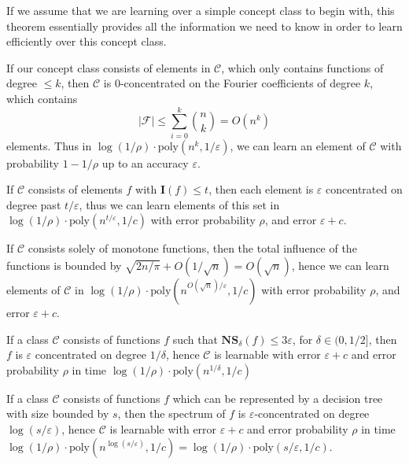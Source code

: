 If we assume that we are learning over a simple concept class to begin with, this theorem essentially provides all the information we need to know in order to learn efficiently over this concept class.

\begin{example}
    If our concept class consists of elements in $\mathcal{C}$, which only contains functions of degree $\leq k$, then $\mathcal{C}$ is 0-concentrated on the Fourier coefficients of degree $k$, which contains
    \[ |\mathcal{F}| \leq \sum_{i = 0}^k {n \choose k} = O(n^k) \]
    elements. Thus in $\log(1/\rho) \cdot \text{poly}(n^k,1/\varepsilon)$, we can learn an element of $\mathcal{C}$ with probability $1 - 1/\rho$ up to an accuracy $\varepsilon$.
\end{example}

\begin{example}
    If $\mathcal{C}$ consists of elements $f$ with $\mathbf{I}(f) \leq t$, then each element is $\varepsilon$ concentrated on degree past $t/\varepsilon$, thus we can learn elements of this set in $\log(1/\rho) \cdot \text{poly}(n^{t/\varepsilon}, 1/c)$ with error probability $\rho$, and error $\varepsilon + c$.
\end{example}

\begin{example}
    If $\mathcal{C}$ consists solely of monotone functions, then the total influence of the functions is bounded by $\sqrt{2n/\pi} + O(1/\sqrt{n}) = O(\sqrt{n})$, hence we can learn elements of $\mathcal{C}$ in $\log(1/\rho) \cdot \text{poly}(n^{O(\sqrt{n})/\varepsilon},1/c)$ with error probability $\rho$, and error $\varepsilon + c$.
\end{example}

\begin{example}
    If a class $\mathcal{C}$ consists of functions $f$ such that $\mathbf{NS}_\delta(f) \leq 3\varepsilon$, for $\delta \in (0,1/2]$, then $f$ is $\varepsilon$ concentrated on degree $1/\delta$, hence $\mathcal{C}$ is learnable with error $\varepsilon + c$ and error probability $\rho$ in time $\log(1/\rho) \cdot \text{poly}(n^{1/\delta},1/c)$
\end{example}

\begin{example}
    If a class $\mathcal{C}$ consists of functions $f$ which can be represented by a decision tree with size bounded by $s$, then the spectrum of $f$ is $\varepsilon$-concentrated on degree $\log(s/\varepsilon)$, hence $\mathcal{C}$ is learnable with error $\varepsilon + c$ and error probability $\rho$ in time $\log(1/\rho) \cdot \text{poly}(n^{\log(s/\varepsilon)}, 1/c) = \log(1/\rho) \cdot \text{poly}(s/\varepsilon, 1/c)$.
\end{example}

